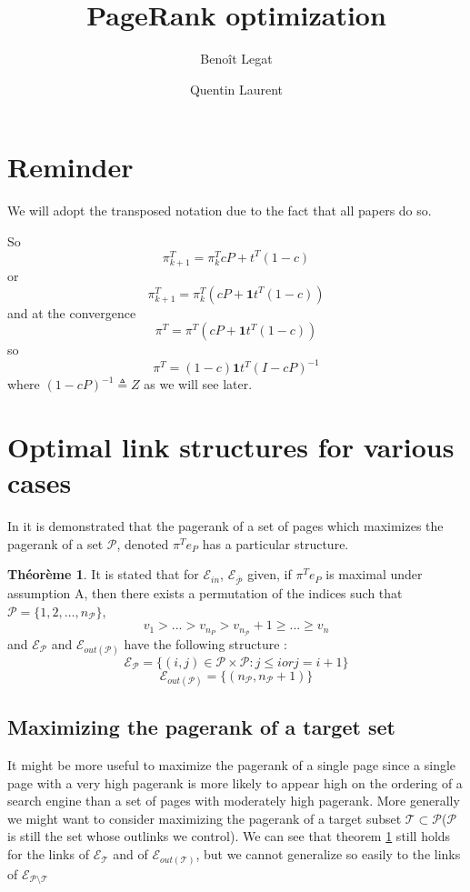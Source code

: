 \documentclass{article}
\author{Benoît Legat \and Quentin Laurent}
\title{PageRank optimization}
\newcommand{\1}{\mathbf{1}}
\theoremstyle{definition}
\newtheorem{mytheo}[mydef]{Théorème}
\begin{document}
\maketitle

\section{Reminder}
We will adopt the transposed notation due to the fact that all papers do so.

So
\[ \pi_{k+1}^T = \pi_k^T cP + t^T(1-c) \]
or
\[ \pi_{k+1}^T = \pi_k^T (cP + \1 t^T(1-c)) \]
and at the convergence
\[ \pi^T = \pi^T (cP + \1 t^T(1-c)) \]
so
\[ \pi^T = (1-c)\1 t^T(I - cP)^{-1} \]
where $(1 - cP)^{-1} \triangleq Z$ as we will see later.

\section{Optimal link structures for various cases}
In \cite{de2008maximizing} it is demonstrated that the pagerank of a set of pages which maximizes the pagerank of a set $\mathcal{P}$, denoted $\pi^T e_{P}$ has a particular structure.\\
\begin{mytheo}
It is stated that for $\mathcal{E}_{in}$, $\mathcal{E}_{\overline{\mathcal{P}}}$ given, if  $\pi^T e_{P}$ is maximal under assumption A, then there exists a permutation of the indices such that 
$\mathcal{P} = \{1,2, \hdots, n_{\mathcal{P}}\}$,
$$ v_1 > ... > v_{n_P}>v_{n_{\mathcal{P}}}+1 \geq ... \geq v_n$$
and $\mathcal{E}_{\mathcal{P}}$ and $\mathcal{E}_{out(\mathcal{P})} $ have the following structure :
$$\mathcal{E}_{\mathcal{P}} = \{(i,j) \in \mathcal{P}\times \mathcal{P} : j \leq i or j = i+1 \}$$
$$\mathcal{E}_{out(\mathcal{P})} = \{(n_{\mathcal{P}},n_{\mathcal{P}}+1)\}$$
\label{thm:optstruct}
\end{mytheo}
\subsection{Maximizing the pagerank of a target set}
It might be more useful to maximize the pagerank of a single page since a single page with a very high pagerank is more likely to appear high on the ordering of a search engine than a set of pages with moderately high pagerank. More generally we might want to consider maximizing the pagerank of a target subset $\mathcal{T} \subset \mathcal{P}$($\mathcal{P}$ is still the set whose outlinks we control).
We can see that theorem \ref{thm:optstruct} still holds for the links of $\mathcal{E}_{\mathcal{T}}$ and of $\mathcal{E}_{out(\mathcal{T})}$, but we cannot generalize so easily to the links of $\mathcal{E}_{\mathcal{P}\setminus \mathcal{T}}$
\end{document}
